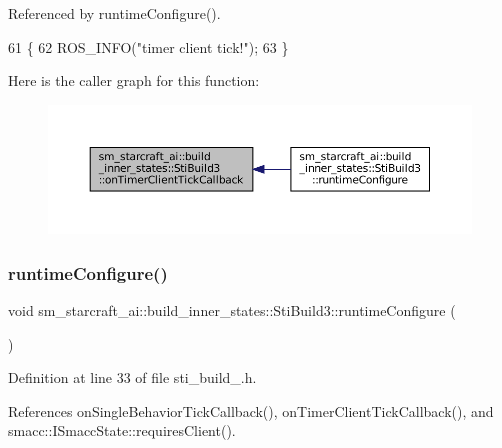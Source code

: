 Referenced by runtime\+Configure().


\begin{DoxyCode}
61   \{
62     ROS\_INFO(\textcolor{stringliteral}{"timer client tick!"});
63   \}
\end{DoxyCode}
Here is the caller graph for this function\+:
\nopagebreak
\begin{figure}[H]
\begin{center}
\leavevmode
\includegraphics[width=350pt]{structsm__starcraft__ai_1_1build__inner__states_1_1StiBuild3_a73f1ba58018abc5a9c2ef617795d9987_icgraph}
\end{center}
\end{figure}
\mbox{\label{structsm__starcraft__ai_1_1build__inner__states_1_1StiBuild3_a8704c84513a0083bebca0cd42beed29b}} 
\subsubsection{\texorpdfstring{runtime\+Configure()}{runtimeConfigure()}}
{\footnotesize\ttfamily void sm\+\_\+starcraft\+\_\+ai\+::build\+\_\+inner\+\_\+states\+::\+Sti\+Build3\+::runtime\+Configure (\begin{DoxyParamCaption}{ }\end{DoxyParamCaption})\hspace{0.3cm}{\ttfamily [inline]}}



Definition at line 33 of file sti\+\_\+build\+\_.\+h.



References on\+Single\+Behavior\+Tick\+Callback(), on\+Timer\+Client\+Tick\+Callback(), and smacc\+::\+I\+Smacc\+State\+::requires\+Client().


